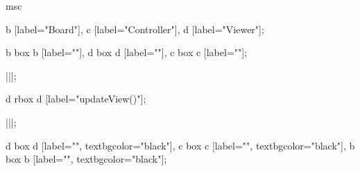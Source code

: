 \begin{msc}
msc {

b [label="Board"],
c [label="Controller"],
d [label="Viewer"];

b box b [label=""],
d box d [label=""],
c box c [label=""];

|||;

d rbox d [label="updateView()"];

|||;

d box d [label="", textbgcolor="black"],
c box c [label="", textbgcolor="black"],
b box b [label="", textbgcolor="black"];

}
\end{msc}
